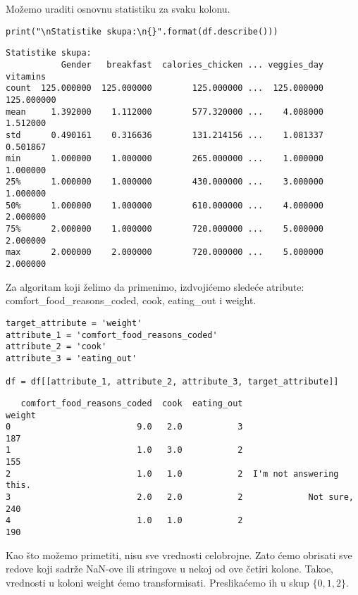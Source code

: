 \documentclass[12pt,a4paper]{article}
\begin{document}
Mo\v zemo uraditi osnovnu statistiku za svaku kolonu.

\begin{lstlisting}[mathescape=true]
print("\nStatistike skupa:\n{}".format(df.describe()))
\end{lstlisting}

\begin{verbatim}
Statistike skupa:
           Gender   breakfast  calories_chicken ... veggies_day    vitamins
count  125.000000  125.000000        125.000000 ...  125.000000  125.000000
mean     1.392000    1.112000        577.320000 ...    4.008000    1.512000
std      0.490161    0.316636        131.214156 ...    1.081337    0.501867
min      1.000000    1.000000        265.000000 ...    1.000000    1.000000
25%      1.000000    1.000000        430.000000 ...    3.000000    1.000000
50%      1.000000    1.000000        610.000000 ...    4.000000    2.000000
75%      2.000000    1.000000        720.000000 ...    5.000000    2.000000
max      2.000000    2.000000        720.000000 ...    5.000000    2.000000
\end{verbatim}

Za algoritam koji \v zelimo da primenimo, izdvoji\' cemo slede\' ce atribute: comfort\_food\_reasons\_coded, cook, eating\_out i weight.

\begin{lstlisting}[mathescape=true]
target_attribute = 'weight'
attribute_1 = 'comfort_food_reasons_coded'
attribute_2 = 'cook'
attribute_3 = 'eating_out'

df = df[[attribute_1, attribute_2, attribute_3, target_attribute]]
\end{lstlisting}

\begin{verbatim}
   comfort_food_reasons_coded  cook  eating_out                    weight
0                         9.0   2.0           3                       187
1                         1.0   3.0           2                       155
2                         1.0   1.0           2  I'm not answering this.
3                         2.0   2.0           2             Not sure, 240
4                         1.0   1.0           2                       190
\end{verbatim}

Kao \v sto mo\v zemo primetiti, nisu sve vrednosti celobrojne. Zato \' cemo obrisati sve redove koji sadr\v ze NaN-ove ili stringove u nekoj od ove \v cetiri kolone. Tako\dj e, vrednosti u koloni weight \' cemo transformisati. Preslika\' cemo ih u skup $\{0, 1, 2\}$.
\end{document}
